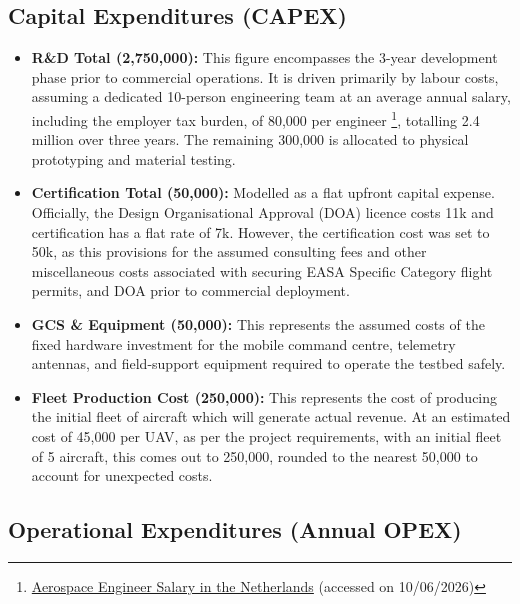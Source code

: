 \subsection{Capital Expenditures (CAPEX)}

\begin{itemize}
    \item \textbf{R\&D Total (\texteuro{}2,750,000):} This figure encompasses the 3-year development phase prior to commercial operations. It is driven primarily by labour costs, assuming a dedicated 10-person engineering team at an average annual salary, including the employer tax burden, of \texteuro{}80,000 per engineer \footnote{\label{foot:payscale}\href{https://www.payscale.com/research/NL/Job=Aerospace_Engineer/Salary}{Aerospace Engineer Salary in the Netherlands} (accessed on 10/06/2026)}, totalling \texteuro{}2.4 million over three years. The remaining \texteuro{}300,000 is allocated to physical prototyping and material testing.

    \item \textbf{Certification Total (\texteuro{}50,000):} Modelled as a flat upfront capital expense. Officially, the Design Organisational Approval (DOA) licence costs \texteuro{}11k and certification has a flat rate of \texteuro{}7k. However, the certification cost was set to \texteuro{}50k, as this provisions for the assumed consulting fees and other miscellaneous costs associated with securing EASA Specific Category flight permits, and DOA prior to commercial deployment.

    \item \textbf{GCS \& Equipment (\texteuro{}50,000):} This represents the assumed costs of the fixed hardware investment for the mobile command centre, telemetry antennas, and field-support equipment required to operate the testbed safely.

    \item \textbf{Fleet Production Cost (\texteuro{}250,000):} This represents the cost of producing the initial fleet of aircraft which will generate actual revenue. At an estimated cost of \texteuro{}45,000 per UAV, as per the project requirements, with an initial fleet of 5 aircraft, this comes out to \texteuro{}250,000, rounded to the nearest \texteuro{}50,000 to account for unexpected costs.
\end{itemize}

\subsection{Operational Expenditures (Annual OPEX)}

